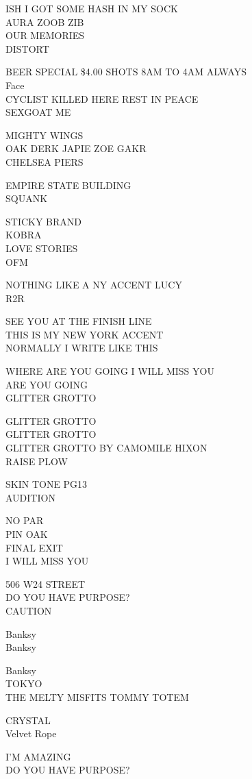 \documentclass[10pt,letterpaper]{article}
\begin{document}
ISH I GOT SOME HASH IN MY SOCK\\
AURA ZOOB ZIB\\
OUR MEMORIES\\
DISTORT

BEER SPECIAL \$4.00 SHOTS 8AM TO 4AM ALWAYS\\
Face\\
CYCLIST KILLED HERE REST IN PEACE\\
SEXGOAT ME

MIGHTY WINGS\\
OAK DERK JAPIE ZOE GAKR\\
CHELSEA PIERS

EMPIRE STATE BUILDING\\
SQUANK

STICKY BRAND\\
KOBRA\\
LOVE STORIES\\
OFM

NOTHING LIKE A NY ACCENT LUCY\\
R2R

SEE YOU AT THE FINISH LINE\\
THIS IS MY NEW YORK ACCENT\\
NORMALLY I WRITE LIKE THIS

WHERE ARE YOU GOING I WILL MISS YOU\\
ARE YOU GOING\\
GLITTER GROTTO

GLITTER GROTTO\\
GLITTER GROTTO\\
GLITTER GROTTO BY CAMOMILE HIXON\\
RAISE PLOW

SKIN TONE PG13\\
AUDITION

NO PAR\\
PIN OAK\\
FINAL EXIT\\
I WILL MISS YOU

506 W24 STREET\\
DO YOU HAVE PURPOSE?\\
CAUTION

Banksy\\
Banksy

Banksy\\
TOKYO\\
THE MELTY MISFITS TOMMY TOTEM

CRYSTAL\\
Velvet Rope

I'M AMAZING\\
DO YOU HAVE PURPOSE?
\end{document}
